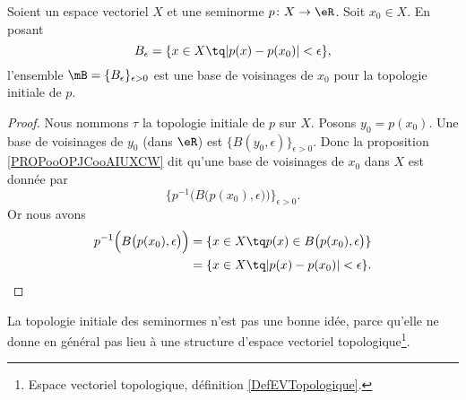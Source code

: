 \begin{proposition}		\label{PROPooVUYTooJXkRYW}
	Soient un espace vectoriel \( X\) et une seminorme \(p \colon X\to \eR \). Soit \( x_0\in X\). En posant
	\begin{equation}
		B_{\epsilon}=\{ x\in X\tq | p(x)-p(x_0) |<\epsilon \},
	\end{equation}
	l'ensemble \( \mB= \{ B_{\epsilon} \}_{\epsilon>0}\) est une base de voisinages de \( x_0\) pour la topologie initiale de \( p\).
\end{proposition}

\begin{proof}
	Nous nommons \( \tau\) la topologie initiale de \( p\) sur \( X\). Posons \( y_0=p(x_0)\). Une base de voisinages de \( y_0\) (dans \( \eR\)) est \( \{ B(y_0,\epsilon) \}_{\epsilon>0}\). Donc la proposition \ref{PROPooOPJCooAIUXCW} dit qu'une base de voisinages de \( x_0\) dans \( X\) est donnée par
	\begin{equation}
		\{ p^{-1}\Big( B\big( p(x_0),\epsilon \big) \Big) \}_{\epsilon>0}.
	\end{equation}
	Or nous avons
	\begin{subequations}
		\begin{align}
			p^{-1}\Big( B\big( p(x_0),\epsilon \big) \Big) & =\{ x\in X\tq p(x)\in B\big( p(x_0),\epsilon \big) \} \\
			                                               & =\{ x\in X\tq | p(x)-p(x_0) |<\epsilon \}.
		\end{align}
	\end{subequations}
\end{proof}

La topologie initiale des seminormes n'est pas une bonne idée, parce qu'elle ne donne en général pas lieu à une structure d'espace vectoriel topologique\footnote{Espace vectoriel topologique, définition \ref{DefEVTopologique}.}.

